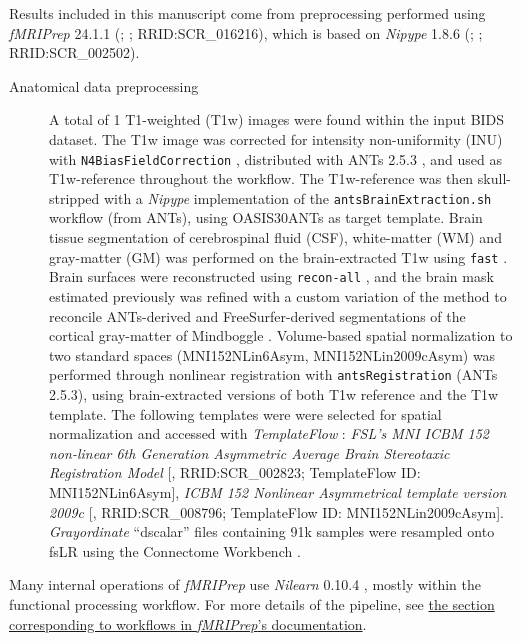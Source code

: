 \documentclass[
]{article}
\author{}
\date{}
\begin{document}
Results included in this manuscript come from preprocessing performed
using \emph{fMRIPrep} 24.1.1 (\citet{fmriprep1}; \citet{fmriprep2};
RRID:SCR\_016216), which is based on \emph{Nipype} 1.8.6
(\citet{nipype1}; \citet{nipype2}; RRID:SCR\_002502).

\begin{description}
\item[Anatomical data preprocessing]
A total of 1 T1-weighted (T1w) images were found within the input BIDS
dataset. The T1w image was corrected for intensity non-uniformity (INU)
with \texttt{N4BiasFieldCorrection} \citep{n4}, distributed with ANTs
2.5.3 \citep[RRID:SCR\_004757]{ants}, and used as T1w-reference
throughout the workflow. The T1w-reference was then skull-stripped with
a \emph{Nipype} implementation of the \texttt{antsBrainExtraction.sh}
workflow (from ANTs), using OASIS30ANTs as target template. Brain tissue
segmentation of cerebrospinal fluid (CSF), white-matter (WM) and
gray-matter (GM) was performed on the brain-extracted T1w using
\texttt{fast} \citep[FSL (version unknown),
RRID:SCR\_002823,][]{fsl_fast}. Brain surfaces were reconstructed using
\texttt{recon-all} \citep[FreeSurfer 7.3.2,
RRID:SCR\_001847,][]{fs_reconall}, and the brain mask estimated
previously was refined with a custom variation of the method to
reconcile ANTs-derived and FreeSurfer-derived segmentations of the
cortical gray-matter of Mindboggle
\citep[RRID:SCR\_002438,][]{mindboggle}. Volume-based spatial
normalization to two standard spaces (MNI152NLin6Asym,
MNI152NLin2009cAsym) was performed through nonlinear registration with
\texttt{antsRegistration} (ANTs 2.5.3), using brain-extracted versions
of both T1w reference and the T1w template. The following templates were
were selected for spatial normalization and accessed with
\emph{TemplateFlow} \citep[24.2.0,][]{templateflow}: \emph{FSL's MNI
ICBM 152 non-linear 6th Generation Asymmetric Average Brain Stereotaxic
Registration Model} {[}\citet{mni152nlin6asym}, RRID:SCR\_002823;
TemplateFlow ID: MNI152NLin6Asym{]}, \emph{ICBM 152 Nonlinear
Asymmetrical template version 2009c} {[}\citet{mni152nlin2009casym},
RRID:SCR\_008796; TemplateFlow ID: MNI152NLin2009cAsym{]}.
\emph{Grayordinate} ``dscalar'' files containing 91k samples were
resampled onto fsLR using the Connectome Workbench \citep{hcppipelines}.
\end{description}

Many internal operations of \emph{fMRIPrep} use \emph{Nilearn} 0.10.4
\citep[RRID:SCR\_001362]{nilearn}, mostly within the functional
processing workflow. For more details of the pipeline, see
\href{https://fmriprep.readthedocs.io/en/latest/workflows.html}{the
section corresponding to workflows in \emph{fMRIPrep}'s documentation}.
\end{document}
